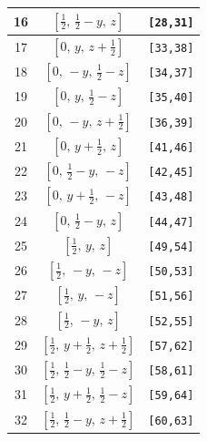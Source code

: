 \documentclass[fleqn,8pt]{jsarticle}
\begin{document}
\begin{longtable}{ccc}
16 & $\left[ \frac{1}{2},\, \frac{1}{2} - y,\, z \right]$ & {\tt [28,31]} \\ \hline
17 & $\left[ 0,\, y,\, z + \frac{1}{2} \right]$ & {\tt [33,38]} \\ \hline
18 & $\left[ 0,\, - y,\, \frac{1}{2} - z \right]$ & {\tt [34,37]} \\ \hline
19 & $\left[ 0,\, y,\, \frac{1}{2} - z \right]$ & {\tt [35,40]} \\ \hline
20 & $\left[ 0,\, - y,\, z + \frac{1}{2} \right]$ & {\tt [36,39]} \\ \hline
21 & $\left[ 0,\, y + \frac{1}{2},\, z \right]$ & {\tt [41,46]} \\ \hline
22 & $\left[ 0,\, \frac{1}{2} - y,\, - z \right]$ & {\tt [42,45]} \\ \hline
23 & $\left[ 0,\, y + \frac{1}{2},\, - z \right]$ & {\tt [43,48]} \\ \hline
24 & $\left[ 0,\, \frac{1}{2} - y,\, z \right]$ & {\tt [44,47]} \\ \hline
25 & $\left[ \frac{1}{2},\, y,\, z \right]$ & {\tt [49,54]} \\ \hline
26 & $\left[ \frac{1}{2},\, - y,\, - z \right]$ & {\tt [50,53]} \\ \hline
27 & $\left[ \frac{1}{2},\, y,\, - z \right]$ & {\tt [51,56]} \\ \hline
28 & $\left[ \frac{1}{2},\, - y,\, z \right]$ & {\tt [52,55]} \\ \hline
29 & $\left[ \frac{1}{2},\, y + \frac{1}{2},\, z + \frac{1}{2} \right]$ & {\tt [57,62]} \\ \hline
30 & $\left[ \frac{1}{2},\, \frac{1}{2} - y,\, \frac{1}{2} - z \right]$ & {\tt [58,61]} \\ \hline
31 & $\left[ \frac{1}{2},\, y + \frac{1}{2},\, \frac{1}{2} - z \right]$ & {\tt [59,64]} \\ \hline
32 & $\left[ \frac{1}{2},\, \frac{1}{2} - y,\, z + \frac{1}{2} \right]$ & {\tt [60,63]} \\
\end{longtable}
\renewcommand{\arraystretch}{1.2}
\end{document}
